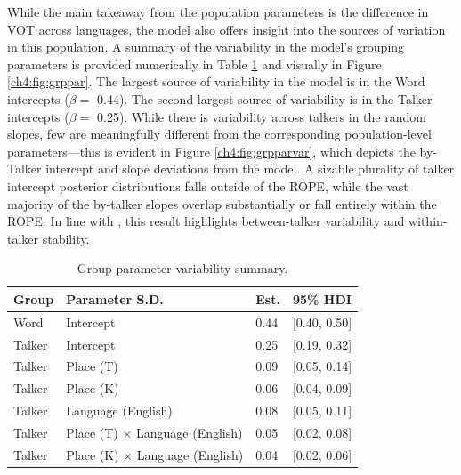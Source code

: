 
While the main takeaway from the population parameters is the difference in VOT across languages, the model also offers insight into the sources of variation in this population. A summary of the variability in the model's grouping parameters is provided numerically in Table \ref{ch4:tab:grppar} and visually in Figure \ref{ch4:fig:grppar}. The largest source of variability in the model is in the Word intercepts ($\beta=$ 0.44). The second-largest source of variability is in the Talker intercepts ($\beta=$ 0.25). While there is variability across talkers in the random slopes, few are meaningfully different from the corresponding population-level parameters---this is evident in Figure \ref{ch4:fig:grpparvar}, which depicts the by-Talker intercept and slope deviations from the model. A sizable plurality of talker intercept posterior distributions falls outside of the ROPE, while the vast majority of the by-talker slopes overlap substantially or fall entirely within the ROPE. In line with \citet{chodroff_2017_structure}, this result highlights between-talker variability and within-talker stability. 

\begin{table}[htbp]
  \caption{Group parameter variability summary.}
    \label{ch4:tab:grppar}
    \centering 
    \footnotesize
    \begin{tabular}{llll}
    \toprule
    \textbf{Group}  &\textbf{Parameter S.D.} & \textbf{Est.} &  \textbf{95\% HDI} \\
    \midrule
    Word    & Intercept                             & 0.44 & [0.40, 0.50] \\
    \midrule
    Talker  & Intercept                             & 0.25 & [0.19, 0.32] \\
    Talker  & Place (T)                             & 0.09 & [0.05, 0.14] \\
    Talker  & Place (K)                             & 0.06 & [0.04, 0.09] \\
    Talker  & Language (English)                    & 0.08 & [0.05, 0.11] \\
    Talker  & Place (T) $\times$ Language (English) & 0.05 & [0.02, 0.08] \\
    Talker  & Place (K) $\times$ Language (English) & 0.04 & [0.02, 0.06] \\
    \bottomrule
    \end{tabular}
\end{table}

